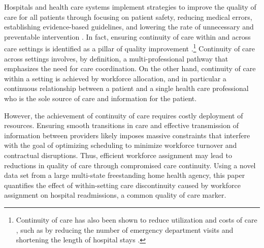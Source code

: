 \documentclass[final,12pt, notitlepage]{article}
\begin{document}
Hospitals and health care systems implement strategies to improve the quality of care for all patients through focusing on patient safety, reducing medical errors, establishing evidence-based guidelines, and lowering the rate of unnecessary and preventable intervention \citep{Kozak2001, Makary2016}.
In fact, ensuring continuity of care within and across care settings is identified as a pillar of quality improvement \citep{Richardson2001}.\footnote{Continuity of care has also been shown to reduce utilization and costs of care \citep{Raddish1999}, such as by reducing the number of emergency department visits and shortening the length of hospital stays \citep{Wasson1984}.}
Continuity of care across settings involves, by definition, a multi-professional pathway that emphasizes the need for care coordination. On the other hand, continuity of care within a setting is achieved by workforce allocation, and in particular a continuous relationship between a patient and a single health care professional who is the sole source of care and information for the patient.

However, the achievement of continuity of care requires costly deployment of resources. Ensuring smooth transitions in care and effective transmission of information between providers likely imposes massive constraints that interfere with the goal of optimizing scheduling to minimize workforce turnover and contractual disruptions. Thus, efficient workforce assignment may lead to reductions in quality of care through compromised care continuity. Using a novel data set from a large multi-state freestanding home health agency, this paper quantifies the effect of within-setting care discontinuity caused by workforce assignment on hospital readmissions, a common quality of care marker.
\end{document}
